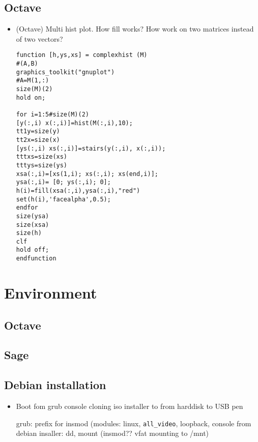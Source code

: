 \subsection{Octave}

\begin{itemize}
\item (Octave) Multi hist plot. How fill works? How work on two matrices instead of two vectors?
\begin{lstlisting}[basicstyle=\small\ttfamily,columns=flexible,breaklines=true]
function [h,ys,xs] = complexhist (M)
#(A,B)
graphics_toolkit("gnuplot")
#A=M(1,:)
size(M)(2)
hold on; 

for i=1:5#size(M)(2)
[y(:,i) x(:,i)]=hist(M(:,i),10);
tt1y=size(y)
tt2x=size(x)
[ys(:,i) xs(:,i)]=stairs(y(:,i), x(:,i));
tttxs=size(xs)
tttys=size(ys)
xsa(:,i)=[xs(1,i); xs(:,i); xs(end,i)];
ysa(:,i)= [0; ys(:,i); 0];
h(i)=fill(xsa(:,i),ysa(:,i),"red")
set(h(i),'facealpha',0.5);
endfor
size(ysa)
size(xsa)
size(h)
clf
hold off;
endfunction
\end{lstlisting}

\end{itemize}


\section{Environment}

\subsection{Octave}

\subsection{Sage}

\subsection{Debian installation}

\begin{itemize}
\item Boot fom grub console cloning iso installer to from harddisk to USB pen
\begin{workout}
grub: prefix for insmod (modules: linux, \verb=all_video=, loopback,
console from debian insaller: dd, mount (insmod?? vfat mounting to /mnt)
\end{workout}

\end{itemize}

